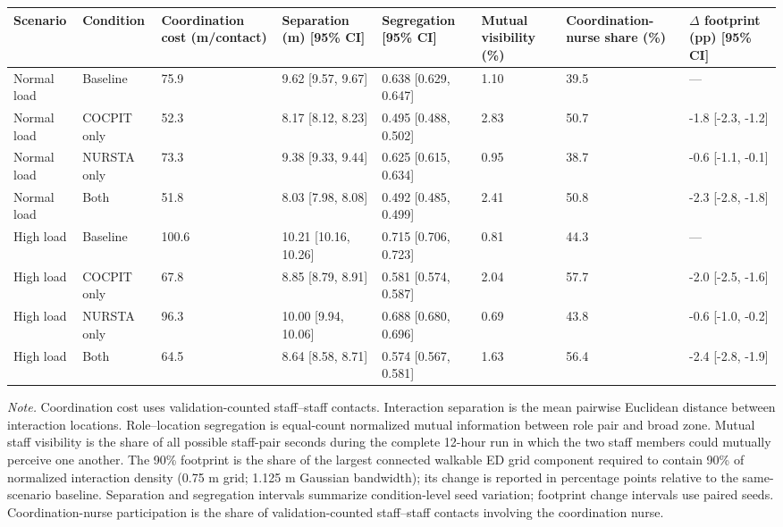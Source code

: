 \begin{tabular}{llllllll}
\toprule
\textbf{Scenario} & \textbf{Condition} & \textbf{Coordination cost (m/contact)} & \textbf{Separation (m) [95\% CI]} & \textbf{Segregation [95\% CI]} & \textbf{Mutual visibility (\%)} & \textbf{Coordination-nurse share (\%)} & \textbf{\ensuremath{\Delta} footprint (pp) [95\% CI]} \\
\midrule
Normal load & Baseline & 75.9 & 9.62 [9.57, 9.67] & 0.638 [0.629, 0.647] & 1.10 & 39.5 & --- \\
Normal load & COCPIT only & 52.3 & 8.17 [8.12, 8.23] & 0.495 [0.488, 0.502] & 2.83 & 50.7 & -1.8 [-2.3, -1.2] \\
Normal load & NURSTA only & 73.3 & 9.38 [9.33, 9.44] & 0.625 [0.615, 0.634] & 0.95 & 38.7 & -0.6 [-1.1, -0.1] \\
Normal load & Both & 51.8 & 8.03 [7.98, 8.08] & 0.492 [0.485, 0.499] & 2.41 & 50.8 & -2.3 [-2.8, -1.8] \\
\addlinespace[2pt]
High load & Baseline & 100.6 & 10.21 [10.16, 10.26] & 0.715 [0.706, 0.723] & 0.81 & 44.3 & --- \\
High load & COCPIT only & 67.8 & 8.85 [8.79, 8.91] & 0.581 [0.574, 0.587] & 2.04 & 57.7 & -2.0 [-2.5, -1.6] \\
High load & NURSTA only & 96.3 & 10.00 [9.94, 10.06] & 0.688 [0.680, 0.696] & 0.69 & 43.8 & -0.6 [-1.0, -0.2] \\
High load & Both & 64.5 & 8.64 [8.58, 8.71] & 0.574 [0.567, 0.581] & 1.63 & 56.4 & -2.4 [-2.8, -1.9] \\
\bottomrule
\end{tabular}

\par\footnotesize\textit{Note.} Coordination cost uses validation-counted staff--staff contacts. Interaction separation is the mean pairwise Euclidean distance between interaction locations. Role--location segregation is equal-count normalized mutual information between role pair and broad zone. Mutual staff visibility is the share of all possible staff-pair seconds during the complete 12-hour run in which the two staff members could mutually perceive one another. The 90\% footprint is the share of the largest connected walkable ED grid component required to contain 90\% of normalized interaction density (0.75 m grid; 1.125 m Gaussian bandwidth); its change is reported in percentage points relative to the same-scenario baseline. Separation and segregation intervals summarize condition-level seed variation; footprint change intervals use paired seeds. Coordination-nurse participation is the share of validation-counted staff--staff contacts involving the coordination nurse.
